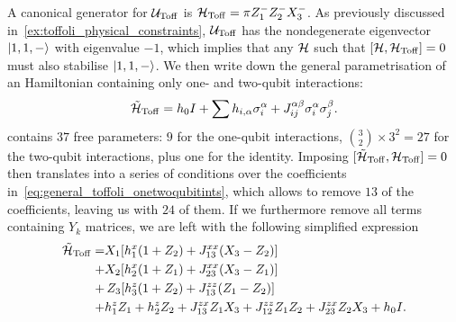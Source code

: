 A canonical generator for $\mathcal{U}_{\operatorname{Toff}}$ is $\mathcal{H}_{\operatorname{Toff}}=\pi Z_1^- Z_2^- X_3^-$.
As previously discussed in~\cref{ex:toffoli_physical_constraints}, $\mathcal{U}_{\operatorname{Toff}}$ has the nondegenerate eigenvector $\ket{1,1,-}$ with eigenvalue $-1$, which implies that any $\mathcal{H}$ such that $[\mathcal{H},\mathcal{H}_{\operatorname{Toff}}]=0$ must also stabilise $\ket{1,1,-}$.
We then write down the general parametrisation of an Hamiltonian containing only one- and two-qubit interactions:
\begin{equation}
    \tilde{\mathcal{H}}_{\operatorname{Toff}} =
    h_0 I + \sum h_{i,\alpha}\sigma_i^\alpha
    + J_{ij}^{\alpha\beta}\sigma_i^\alpha\sigma_j^\beta.
    \label{eq:general_toffoli_onetwoqubitints}
\end{equation}
 contains $37$ free parameters: $9$ for the one-qubit interactions, $\binom{3}{2}\times 3^2=27$ for the two-qubit interactions, plus one for the identity.
Imposing $[\tilde{\mathcal{H}}_{\operatorname{Toff}},\mathcal{H}_{\operatorname{Toff}}]=0$ then translates into a series of conditions over the coefficients in~\cref{eq:general_toffoli_onetwoqubitints}, which allows to remove $13$ of the coefficients, leaving us with $24$ of them.
If we furthermore remove all terms containing $Y_k$ matrices, we are left with the following simplified expression
\begin{equation}
\begin{aligned}
    \tilde{\mathcal{H}}_{\operatorname{Toff}} =
    & X_1 [h_1^x (1 + Z_2) + J_{13}^{xx} (X_3 - Z_2)] \\
    +&X_2 [h_2^x (1 + Z_1) + J_{23}^{xx} (X_3 - Z_1)] \\
    +&\,Z_3 [h_3^z(1 + Z_2) + J_{13}^{zz} (Z_1 - Z_2)] \\
    + &h_1^z Z_1 + h_2^z Z_2
    + J_{13}^{zx} Z_1 X_3 + J_{12}^{zz} Z_1 Z_2 + J_{23}^{zx} Z_2 X_3
    +h_0 I.
    \label{eq:general_toffoli_onetwoqubitints_without_Ys}
\end{aligned}
\end{equation}
